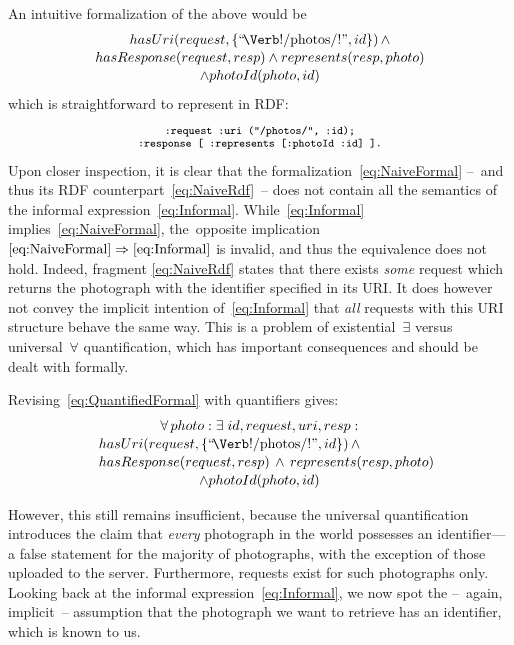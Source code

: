 \documentclass[runningheads,a4paper, twocolumn]{llncs}
\begin{document}
\noindent An intuitive formalization of the above would be
\begin{multline}\label{eq:NaiveFormal}
	\makebox[5.2cm]{$hasUri(request, \{\mbox{``\!\Verb!/photos/!''}, id\})\, \land$} \\[-.2em]
	hasResponse(request, resp) \land represents(resp, photo)\\[-.2em]
	\land photoId(photo, id)
\end{multline}
which is straightforward to represent in RDF:
\begin{multline}\label{eq:NaiveRdf}
	\fontsize{8}{10}\texttt{:request :uri ("/photos/", :id);} \\[-.6em]
	\fontsize{8}{10}\texttt{:response [ :represents [:photoId :id] ].}
\end{multline}
Upon closer inspection, it is clear that the formalization~\ref{eq:NaiveFormal} --~and thus its RDF counterpart~\ref{eq:NaiveRdf}~-- does not contain all the semantics of the informal expression~\ref{eq:Informal}. While~\ref{eq:Informal} implies~\ref{eq:NaiveFormal}, the~opposite implication \mbox{$\ref{eq:NaiveFormal} \Rightarrow \ref{eq:Informal}$} is invalid, and thus the equivalence does not hold. Indeed, fragment \ref{eq:NaiveRdf} states that there exists \emph{some} request which returns the photograph with the identifier specified in its URI. It does however not convey the implicit intention of~\ref{eq:Informal} that \emph{all} requests with this URI structure behave the same way. This is a problem of existential~$\exists$ versus universal~$\forall$ quantification, which has important consequences and should be dealt with formally.

Revising~\ref{eq:QuantifiedFormal} with quantifiers gives:
\begin{multline}\label{eq:QuantifiedFormal}
	\makebox[4.4cm]{$\forall\, photo : \exists\; id, request, uri, resp :$} \\[-.2em]
	\shoveleft{hasUri(request, \{\mbox{``\!\Verb!/photos/!''}, id\})\, \land} \\[-.2em]
	\shoveleft{hasResponse(request, resp) \,\land\, represents(resp, photo)}\\[-.2em]
	\land photoId(photo, id)
\end{multline}

\noindent However, this still remains insufficient, because the universal quantification introduces the claim that \emph{every} photograph in the world possesses an identifier---a false statement for the majority of photographs, with the exception of those uploaded to the server. Furthermore, requests exist for such photographs only. Looking back at the informal expression~\ref{eq:Informal}, we now spot the --~again, implicit~-- assumption that the photograph we want to retrieve has an identifier, which is known to us.
\end{document}
